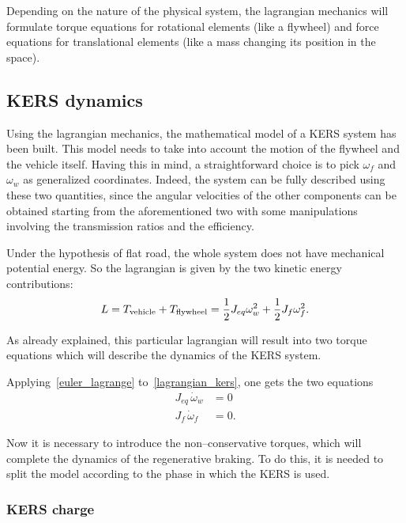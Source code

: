 \documentclass[11pt]{article}
\begin{document}
Depending on the nature of the physical system, the lagrangian mechanics will formulate torque equations for rotational elements (like a flywheel) and force equations for translational elements (like a mass changing its position in the space).

\subsection{KERS dynamics}

Using the lagrangian mechanics, the mathematical model of a KERS system has been built. This model needs to take into account the motion of the flywheel and the vehicle itself. Having this in mind, a straightforward choice is to pick $\omega_f$ and $\omega_w$ as generalized coordinates. Indeed, the system can be fully described using these two quantities, since the angular velocities of the other components can be obtained starting from the aforementioned two with some manipulations involving the transmission ratios and the efficiency. 

Under the hypothesis of flat road, the whole system does not have mechanical potential energy. So the lagrangian is given by the two kinetic energy contributions:
\begin{equation}
L = T_{\textup{vehicle}} + T_{\textup{flywheel}} = \dfrac{1}{2}J_{eq}\omega_w^2 + \dfrac{1}{2}J_f\omega_f^2. 
\label{lagrangian_kers}
\end{equation}

As already explained, this particular lagrangian will result into two torque equations which will describe the dynamics of the KERS system.

Applying~\eqref{euler_lagrange} to~\eqref{lagrangian_kers}, one gets the two equations
\begin{equation}
\begin{split}
J_{eq}\, \dot{\omega}_w & = 0 \\
J_f\, \dot{\omega}_f & = 0.
\end{split}
\label{free_dynamics}
\end{equation}

Now it is necessary to introduce the non--conservative torques, which will complete the dynamics of the regenerative braking. To do this, it is needed to split the model according to the phase in which the KERS is used.

\subsubsection{KERS charge}
\end{document}
